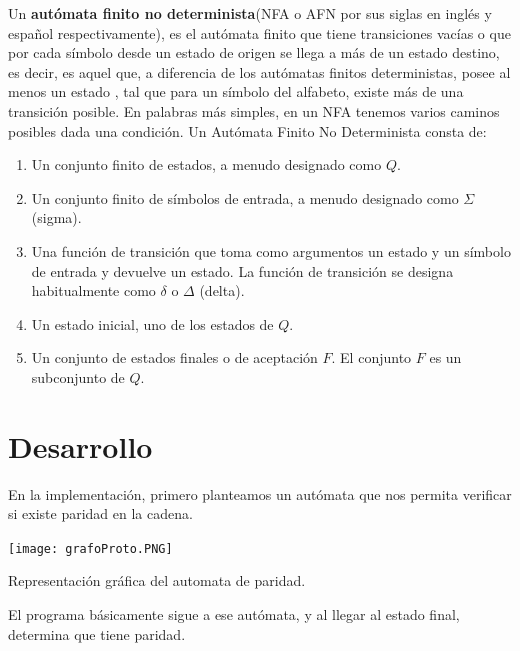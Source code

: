 \documentclass{article}
\begin{document}
Un \textbf{autómata finito no determinista}(NFA o AFN por sus siglas en inglés y español respectivamente), es el autómata finito que tiene transiciones vacías o que por cada símbolo desde un estado de origen se llega a más de un estado destino, es decir, es aquel que, a diferencia de los autómatas finitos deterministas, posee al menos un estado , tal que para un símbolo  del alfabeto, existe más de una transición posible. En palabras más simples, en un NFA tenemos varios caminos posibles dada una condición.
Un Autómata Finito No Determinista consta de:
\begin{enumerate}
    \item Un conjunto finito de estados, a menudo designado como $Q$.
    \item Un conjunto finito de símbolos de entrada, a menudo designado como $\Sigma$ (sigma).
    \item Una función de transición que toma como argumentos un estado y un símbolo de entrada y devuelve un estado. La función de transición se designa habitualmente como $\delta$ o $\Delta$ (delta).
    \item Un estado inicial, uno de los estados de $Q$.
    \item Un conjunto de estados finales o de aceptación $F$. El conjunto $F$ es un subconjunto de $Q$.
\end{enumerate}
\newpage
\section{Desarrollo}
En la implementación, primero planteamos un autómata que nos permita verificar si existe paridad en la cadena.

\begin{center}
    \texttt{[image: grafoProto.PNG]}
    \caption{Representación gráfica del automata de paridad.}
    \newline
\end{center}
El programa básicamente sigue a ese autómata, y al llegar al estado final, determina que tiene paridad.
\end{document}
